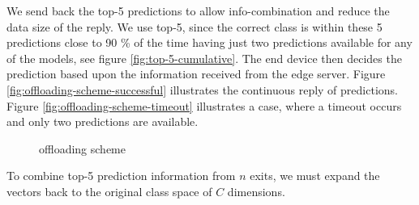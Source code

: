We send back the top-5 predictions to allow info-combination and reduce the data size of the reply. We use top-5, since the correct class is within these 5 predictions close to 90 \% of the time having just two predictions available for any of the models, see figure \ref{fig:top-5-cumulative}. The end device then decides the prediction based upon the information received from the edge server. Figure \ref{fig:offloading-scheme-successful} illustrates the continuous reply of predictions. Figure \ref{fig:offloading-scheme-timeout} illustrates a case, where a timeout occurs and only two predictions are available.

\begin{figure}
	\captionsetup[subfigure]{justification=centering}
	\centering
	\hfill
	\caption[Offloading scheme]{offloading scheme}
	\label{fig:offloading-scheme}
\end{figure} 

To combine top-5 prediction information from $ n $ exits, we must expand the vectors back to the original class space of $ C $ dimensions.

